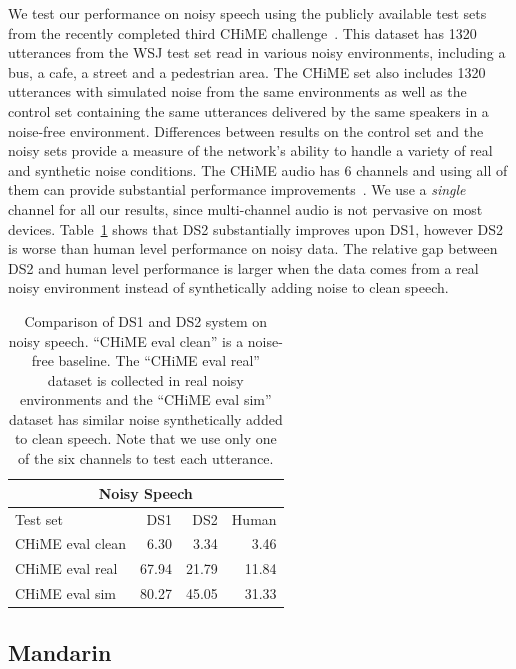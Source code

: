 \documentclass{article}
\begin{document}
We test our performance on noisy speech using the publicly available test sets from the recently completed third CHiME challenge~\cite{barker2015chime}. This dataset has 1320 utterances from the WSJ test set read in various noisy environments, including a bus, a cafe, a street and a pedestrian area. The CHiME set also includes 1320 utterances with simulated noise from the same environments as well as the control set containing the same utterances delivered by the same speakers in a noise-free environment. Differences between results on the control set and the noisy sets provide a measure of the network's ability to handle a variety of real and synthetic noise conditions. The CHiME audio has 6 channels and using all of them can provide substantial performance improvements~\cite{yoshioka2015}. We use a {\it single} channel for all our results, since multi-channel audio is not pervasive on most devices. Table~\ref{table:chime} shows that DS2 substantially improves upon DS1, however DS2 is worse than human level performance on noisy data. The relative gap between DS2 and human level performance is larger when the data comes from a real noisy environment instead of synthetically adding noise to clean speech.

\begin{table}
\centering
\begin{tabular}{l  r  r r}
\toprule
\multicolumn{4}{c}{Noisy Speech}\\
\midrule
Test set & DS1 & DS2  &  Human \\
\midrule
CHiME eval clean & 6.30  & 3.34  & 3.46 \\
CHiME eval real  & 67.94 & 21.79 & 11.84 \\
CHiME eval sim   & 80.27 & 45.05 & 31.33 \\
\bottomrule
\end{tabular}
\caption{Comparison of DS1 and DS2 system on noisy speech. ``CHiME eval clean'' is a noise-free baseline. The ``CHiME eval real'' dataset is collected in real noisy environments and the ``CHiME eval sim'' dataset has similar noise synthetically added to clean speech. Note that we use only one of the six channels to test each utterance.}
\label{table:chime}
\end{table}

\subsection{Mandarin}
\label{subsection:results-mandarin}
\end{document}
